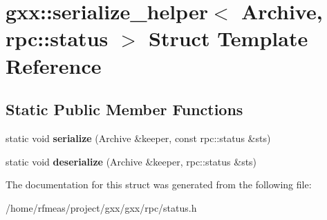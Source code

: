 \hypertarget{structgxx_1_1serialize__helper_3_01Archive_00_01rpc_1_1status_01_4}{}\section{gxx\+:\+:serialize\+\_\+helper$<$ Archive, rpc\+:\+:status $>$ Struct Template Reference}
\label{structgxx_1_1serialize__helper_3_01Archive_00_01rpc_1_1status_01_4}
\subsection*{Static Public Member Functions}
\begin{DoxyCompactItemize}
\item 
static void {\bfseries serialize} (Archive \&keeper, const rpc\+::status \&sts)\hypertarget{structgxx_1_1serialize__helper_3_01Archive_00_01rpc_1_1status_01_4_a89c65ab358aa9e18bd634dd2b33565c9}{}\label{structgxx_1_1serialize__helper_3_01Archive_00_01rpc_1_1status_01_4_a89c65ab358aa9e18bd634dd2b33565c9}

\item 
static void {\bfseries deserialize} (Archive \&keeper, rpc\+::status \&sts)\hypertarget{structgxx_1_1serialize__helper_3_01Archive_00_01rpc_1_1status_01_4_ac280982a35f6870f9c124394fd158d17}{}\label{structgxx_1_1serialize__helper_3_01Archive_00_01rpc_1_1status_01_4_ac280982a35f6870f9c124394fd158d17}

\end{DoxyCompactItemize}


The documentation for this struct was generated from the following file\+:\begin{DoxyCompactItemize}
\item 
/home/rfmeas/project/gxx/gxx/rpc/status.\+h\end{DoxyCompactItemize}
